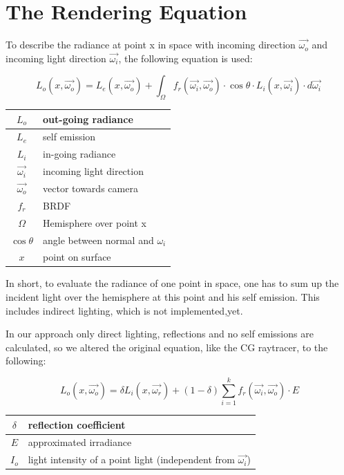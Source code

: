 \documentclass[11pt,a4paper]{article}
\begin{document}
\newpage
\section{The Rendering Equation}
\label{sec:renderingequation}
To describe the radiance at point x in space with incoming direction $\vec{\omega_o}$ and incoming light direction $\vec{\omega_i}$, the following equation\cite{Kaj86} is used:

\begin{equation}
L_o(x,\vec{\omega_o}) = L_e(x,\vec{\omega_o}) + \int_\Omega f_r(\vec{\omega_i},\vec{\omega_o}) \cdot \cos\theta \cdot L_i(x,\vec{\omega_i}) \cdot d\vec{\omega_i}\
\label{eq:renderingequation}
\end{equation}

\begin{table}[h]
\begin{tabular}{| c | l |}
\hline
$L_o$ & out-going radiance\\ \hline
$L_e$ & self emission\\ \hline
$L_i$ & in-going radiance\\ \hline
$\vec{\omega_i}$ & incoming light direction\\ \hline
$\vec{\omega_o}$ & vector towards camera\\ \hline
$f_r$ & BRDF\\ \hline
$\Omega$ & Hemisphere over point x\\ \hline
$\cos\theta$ & angle between normal and $\omega_i$\\ \hline
$x$ & point on surface\\ \hline
\end{tabular}
\end{table}

In short, to evaluate the radiance of one point in space, one has to sum up the incident light over the hemisphere at this point and his self emission. This includes indirect lighting, which is not implemented,yet.

		
In our approach only direct lighting, reflections and no self emissions are calculated, so we altered the original equation, like the CG raytracer, to the following:

\begin{equation}
L_o(x,\vec{\omega_o}) = \delta L_i(x,\vec{\omega_r}) + (1- \delta) \sum_{i=1}^{k} f_r(\vec{\omega_i},\vec{\omega_o}) \cdot E
\label{eq:simplerenderingequation}
\end{equation}


\begin{table}[H]
\begin{tabular}{| c | l |}
\hline
$\delta$ & reflection coefficient\\ \hline
$E$ & approximated irradiance\\ \hline
$I_o$ & light intensity of a point light (independent from $\vec{\omega_i}$)\\ \hline
\end{tabular}
\end{table}
\end{document}
